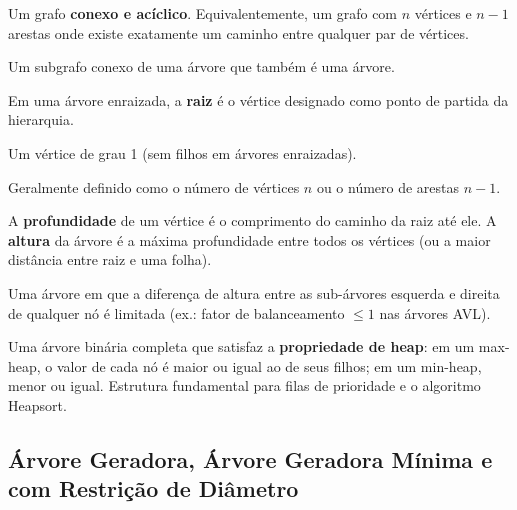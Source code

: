 \documentclass[12pt,a4paper]{article}
\begin{document}
\begin{description}[leftmargin=0pt]
  \item[Árvore] Um grafo \textbf{conexo e acíclico}. Equivalentemente, um grafo com $n$ vértices e $n-1$ arestas onde existe exatamente um caminho entre qualquer par de vértices.

  \item[Sub-Árvore] Um subgrafo conexo de uma árvore que também é uma árvore.

  \item[Raiz] Em uma árvore enraizada, a \textbf{raiz} é o vértice designado como ponto de partida da hierarquia.

  \item[Folha] Um vértice de grau 1 (sem filhos em árvores enraizadas).

  \item[Tamanho de uma Árvore] Geralmente definido como o número de vértices $n$ ou o número de arestas $n-1$.

  \item[Profundidade (Altura)] A \textbf{profundidade} de um vértice é o comprimento do caminho da raiz até ele. A \textbf{altura} da árvore é a máxima profundidade entre todos os vértices (ou a maior distância entre raiz e uma folha).

  \item[Árvore Balanceada] Uma árvore em que a diferença de altura entre as sub-árvores esquerda e direita de qualquer nó é limitada (ex.: fator de balanceamento $\leq 1$ nas árvores AVL).

  \item[Heap] Uma árvore binária completa que satisfaz a \textbf{propriedade de heap}: em um max-heap, o valor de cada nó é maior ou igual ao de seus filhos; em um min-heap, menor ou igual. Estrutura fundamental para filas de prioridade e o algoritmo Heapsort.
\end{description}

\subsection{Árvore Geradora, Árvore Geradora Mínima e com Restrição de Diâmetro}
\end{document}
